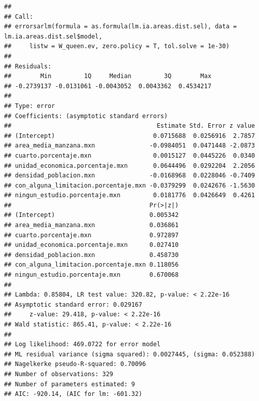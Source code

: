 \documentclass[12pt,]{book}
\newenvironment{Shaded}{\begin{snugshade}}{\end{snugshade}}
\newcommand{\KeywordTok}[1]{\textcolor[rgb]{0.13,0.29,0.53}{\textbf{#1}}}
\newcommand{\DataTypeTok}[1]{\textcolor[rgb]{0.13,0.29,0.53}{#1}}
\newcommand{\FloatTok}[1]{\textcolor[rgb]{0.00,0.00,0.81}{#1}}
\newcommand{\StringTok}[1]{\textcolor[rgb]{0.31,0.60,0.02}{#1}}
\newcommand{\CommentTok}[1]{\textcolor[rgb]{0.56,0.35,0.01}{\textit{#1}}}
\newcommand{\OperatorTok}[1]{\textcolor[rgb]{0.81,0.36,0.00}{\textbf{#1}}}
\newcommand{\NormalTok}[1]{#1}
\begin{document}
\begin{verbatim}
## 
## Call:
## errorsarlm(formula = as.formula(lm.ia.areas.dist.sel), data = lm.ia.areas.dist.sel$model, 
##     listw = W_queen.ev, zero.policy = T, tol.solve = 1e-30)
## 
## Residuals:
##        Min         1Q     Median         3Q        Max 
## -0.2739137 -0.0131061 -0.0043052  0.0043362  0.4534217 
## 
## Type: error 
## Coefficients: (asymptotic standard errors) 
##                                        Estimate Std. Error z value
## (Intercept)                           0.0715688  0.0256916  2.7857
## area_media_manzana.mxn               -0.0984051  0.0471448 -2.0873
## cuarto.porcentaje.mxn                 0.0015127  0.0445226  0.0340
## unidad_economica.porcentaje.mxn       0.0644496  0.0292204  2.2056
## densidad_poblacion.mxn               -0.0168968  0.0228046 -0.7409
## con_alguna_limitacion.porcentaje.mxn -0.0379299  0.0242676 -1.5630
## ningun_estudio.porcentaje.mxn         0.0181776  0.0426649  0.4261
##                                      Pr(>|z|)
## (Intercept)                          0.005342
## area_media_manzana.mxn               0.036861
## cuarto.porcentaje.mxn                0.972897
## unidad_economica.porcentaje.mxn      0.027410
## densidad_poblacion.mxn               0.458730
## con_alguna_limitacion.porcentaje.mxn 0.118056
## ningun_estudio.porcentaje.mxn        0.670068
## 
## Lambda: 0.85804, LR test value: 320.82, p-value: < 2.22e-16
## Asymptotic standard error: 0.029167
##     z-value: 29.418, p-value: < 2.22e-16
## Wald statistic: 865.41, p-value: < 2.22e-16
## 
## Log likelihood: 469.0722 for error model
## ML residual variance (sigma squared): 0.0027445, (sigma: 0.052388)
## Nagelkerke pseudo-R-squared: 0.70096 
## Number of observations: 329 
## Number of parameters estimated: 9 
## AIC: -920.14, (AIC for lm: -601.32)
\end{verbatim}

\begin{Shaded}
\end{Shaded}
\end{document}
